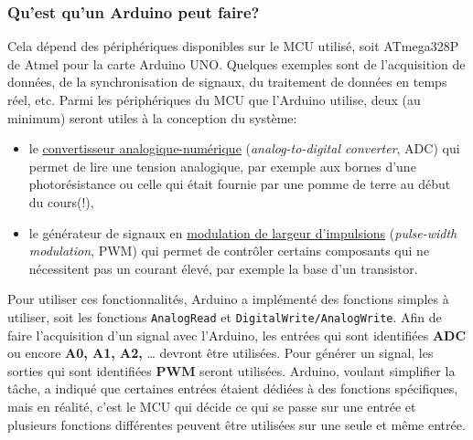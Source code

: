 \documentclass[english,french,12pt]{article}
\begin{document}
\subsubsection*{Qu'est qu'un Arduino peut faire?}
Cela dépend des périphériques disponibles sur le MCU utilisé, soit ATmega328P de Atmel pour la carte Arduino UNO. Quelques exemples sont de l’acquisition de données, de la synchronisation de signaux, du traitement de données en temps réel, etc. Parmi les périphériques du MCU que l’Arduino utilise, deux (au minimum) seront utiles à la conception du système:
\begin{itemize}
    \item le \href{https://en.wikipedia.org/wiki/Analog-to-digital_converter}{convertisseur analogique-numérique} (\textit{analog-to-digital converter}, ADC) qui permet de lire une tension analogique, par exemple aux bornes d’une photorésistance ou celle qui était fournie par une pomme de terre au début du cours(!),
    \item le générateur de signaux en \href{https://en.wikipedia.org/wiki/Pulse-width_modulation}{modulation de largeur d'impulsions} (\textit{pulse-width modulation}, PWM) qui permet de contrôler certains composants qui ne nécessitent pas un courant élevé, par exemple la base d’un transistor.
\end{itemize}

 Pour utiliser ces fonctionnalités, Arduino a implémenté des fonctions simples à utiliser, soit les fonctions \texttt{AnalogRead}  et \texttt{DigitalWrite/AnalogWrite}. Afin de faire l’acquisition d’un signal avec l’Arduino, les entrées qui sont identifiées \textbf{ADC} ou encore \textbf{A0, A1, A2,} … devront être utilisées. Pour générer un signal, les sorties qui sont identifiées \textbf{PWM} seront utilisées. Arduino, voulant simplifier la tâche, a indiqué que certaines entrées étaient dédiées à des fonctions spécifiques, mais en réalité, c’est le MCU qui décide ce qui se passe sur une entrée et plusieurs fonctions différentes peuvent être utilisées sur une seule et même entrée.
 
\end{document}
